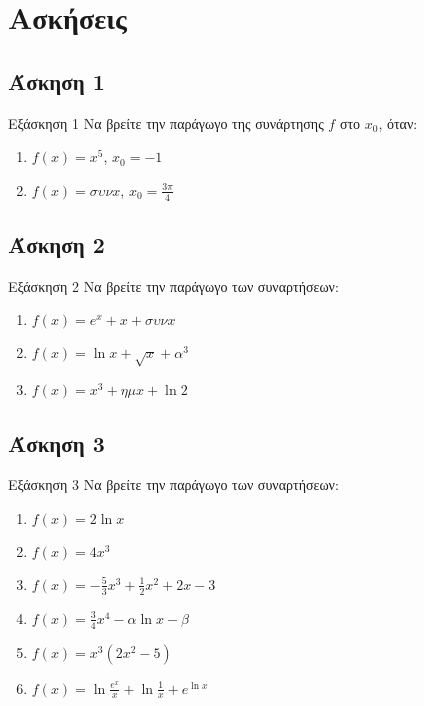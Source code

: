 \documentclass[greek]{beamer}
\begin{document}
\section{Ασκήσεις}
\subsection{Άσκηση 1}
\begin{frame}[label=Άσκηση1]{Εξάσκηση 1}
  Να βρείτε την παράγωγο της συνάρτησης $f$ στο $x_0$, όταν:
  \begin{enumerate}
    \item<1-> $f(x)=x^5$, $x_0=-1$
    \item<2-> $f(x)=συνx$, $x_0=\frac{3π}{4}$
  \end{enumerate}

\end{frame}

\subsection{Άσκηση 2}
\begin{frame}[label=Άσκηση2]{Εξάσκηση 2}
  Να βρείτε την παράγωγο των συναρτήσεων:
  \begin{enumerate}
    \item<1-> $f(x)=e^x+x+συνx$
    \item<2-> $f(x)=\ln x+\sqrt{x}+α^3$
    \item<3-> $f(x)=x^3+ημx+\ln 2$
  \end{enumerate}

\end{frame}

\subsection{Άσκηση 3}
\begin{frame}[label=Άσκηση3]{Εξάσκηση 3}
  Να βρείτε την παράγωγο των συναρτήσεων:
  \begin{enumerate}
    \item<1-> $f(x)=2\ln x$
    \item<2-> $f(x)=4x^3$
    \item<3-> $f(x)=-\frac{5}{3}x^3+\frac{1}{2}x^2+2x-3$
    \item<4-> $f(x)=\frac{3}{4}x^4-α\ln x-β$
    \item<5-> $f(x)=x^3(2x^2-5)$
    \item<6-> $f(x)=\ln \frac{e^x}{x}+\ln \frac{1}{x}+e^{\ln x}$
  \end{enumerate}

\end{frame}
\end{document}
